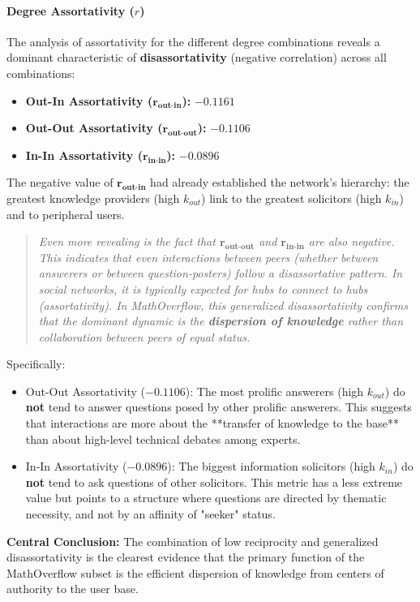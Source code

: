 \documentclass[sigplan]{acmart}
\begin{document}
\paragraph{Degree Assortativity ($r$)}
The analysis of assortativity for the different degree combinations reveals a dominant characteristic of \textbf{disassortativity} (negative correlation) across all combinations:
\begin{itemize}
\item \textbf{Out-In Assortativity ($\mathbf{r_{\text{out-in}}}$):} $\mathbf{-0.1161}$
\item \textbf{Out-Out Assortativity ($\mathbf{r_{\text{out-out}}}$):} $\mathbf{-0.1106}$
\item \textbf{In-In Assortativity ($\mathbf{r_{\text{in-in}}}$):} $\mathbf{-0.0896}$
\end{itemize}
The negative value of $\mathbf{r_{\text{out-in}}}$ had already established the network's hierarchy: the greatest knowledge providers (high $k_{out}$) link to the greatest solicitors (high $k_{in}$) and to peripheral users.
\begin{quote}
\textit{Even more revealing is the fact that $\mathbf{r_{\text{out-out}}}$ and $\mathbf{r_{\text{in-in}}}$ are also negative. This indicates that even interactions between peers (whether between answerers or between question-posters) follow a disassortative pattern. In social networks, it is typically expected for hubs to connect to hubs (assortativity). In MathOverflow, this generalized disassortativity confirms that the dominant dynamic is the \textbf{dispersion of knowledge} rather than collaboration between peers of equal status.}
\end{quote}
Specifically:
\begin{itemize}
\item Out-Out Assortativity ($\mathbf{-0.1106}$): The most prolific answerers (high $k_{out}$) do \textbf{not} tend to answer questions posed by other prolific answerers. This suggests that interactions are more about the **transfer of knowledge to the base** than about high-level technical debates among experts.
\item In-In Assortativity ($\mathbf{-0.0896}$): The biggest information solicitors (high $k_{in}$) do \textbf{not} tend to ask questions of other solicitors. This metric has a less extreme value but points to a structure where questions are directed by thematic necessity, and not by an affinity of "seeker" status.
\end{itemize}
\textbf{Central Conclusion:} The combination of low reciprocity and generalized disassortativity is the clearest evidence that the primary function of the MathOverflow subset is the efficient dispersion of knowledge from centers of authority to the user base.
\end{document}
